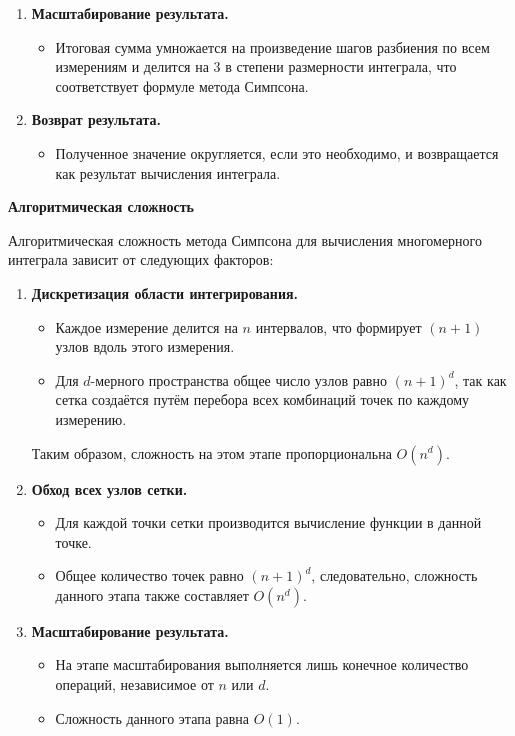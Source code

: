 \documentclass{report}
\begin{document}
\begin{enumerate}
    \item \textbf{Масштабирование результата.}
    \begin{itemize}
        \item Итоговая сумма умножается на произведение шагов разбиения по всем измерениям и делится на 3 в степени размерности интеграла, что соответствует формуле метода Симпсона.
    \end{itemize}

    \item \textbf{Возврат результата.}
    \begin{itemize}
        \item Полученное значение округляется, если это необходимо, и возвращается как результат вычисления интеграла.
    \end{itemize}
\end{enumerate}

\textbf{Алгоритмическая сложность}  

Алгоритмическая сложность метода Симпсона для вычисления многомерного интеграла зависит от следующих факторов:

\begin{enumerate}
    \item \textbf{Дискретизация области интегрирования.}  
    \begin{itemize}
        \item Каждое измерение делится на \( n \) интервалов, что формирует \( (n+1) \) узлов вдоль этого измерения.
        \item Для \( d \)-мерного пространства общее число узлов равно \( (n+1)^d \), так как сетка создаётся путём перебора всех комбинаций точек по каждому измерению.  
    \end{itemize}
    Таким образом, сложность на этом этапе пропорциональна \( O(n^d) \).

    \item \textbf{Обход всех узлов сетки.}  
    \begin{itemize}
        \item Для каждой точки сетки производится вычисление функции в данной точке. 
        \item Общее количество точек равно \( (n+1)^d \), следовательно, сложность данного этапа также составляет \( O(n^d) \).
    \end{itemize}

    \item \textbf{Масштабирование результата.}  
    \begin{itemize}
        \item На этапе масштабирования выполняется лишь конечное количество операций, независимое от \( n \) или \( d \).  
        \item Сложность данного этапа равна \( O(1) \).
    \end{itemize}
\end{enumerate}
\end{document}
